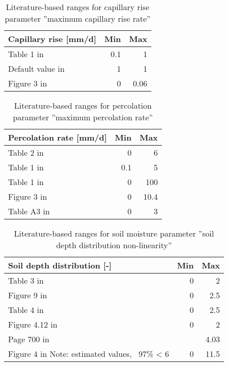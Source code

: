 \begin{table}[htbp]
  \centering
  \caption[References: Capillary rise rate]{Literature-based ranges for capillary rise parameter ''maximum capillary rise rate''}
    \begin{tabular}{lrr}
    \toprule
    \textbf{Capillary rise [mm/d]} & \textbf{Min} & \textbf{Max} \\
    \midrule
    Table 1 in \cite{Rusli2015} & 0.1   & 1 \\
    Default value in \cite{SMHI2004} & 1     & 1 \\
    Figure 3 in \cite{Bethune2008} & 0     & 0.06 \\
    \bottomrule
    \end{tabular}%
  \label{tab:sm4_cap}%
\end{table}%


\begin{table}[htbp]
  \centering
  \caption[References: Percolation rate]{Literature-based ranges for percolation parameter ''maximum percolation rate''}
    \begin{tabular}{lrr}
    \toprule
    \textbf{Percolation rate [mm/d]} & \textbf{Min} & \textbf{Max} \\
    \midrule
    Table 2 in \cite{Seibert1997} & 0     & 6 \\
    Table 1 in \cite{Rusli2015} & 0.1   & 5 \\
    Table 1 in \cite{Kollat2012} & 0     & 100 \\
    Figure 3 in \cite{Bethune2008} & 0     & 10.4 \\
    Table A3 in \cite{Seibert2012} & 0     & 3 \\
    \bottomrule
    \end{tabular}%
  \label{tab:sm4_perc}%
\end{table}%


\begin{table}[htbp]
  \centering
  \caption[References: Soil-depth distribution non-linearity]{Literature-based ranges for soil moisture parameter ''soil depth distribution non-linearity''}
    \begin{tabular}{lrr}
    \toprule
    \textbf{Soil depth distribution [-]} & \textbf{Min} & \textbf{Max} \\
    \midrule
    Table 3 in \cite{Sun2015} & 0     & 2 \\
    Figure 9 in \cite{Lamb1999} & 0     & 2.5 \\
    Table 4 in \cite{Bulygina2009} & 0     & 2.5 \\
    Figure 4.12 in \cite{Wagener2004}  & 0     & 2 \\
    Page 700 in \cite{Sivapalan1995} &       & 4.03 \\
    Figure 4 in \cite{Huang2003} Note: estimated values, ~97\% < 6 & 0     & 11.5 \\
    \bottomrule
    \end{tabular}%
  \label{tab:sm4_soilnl}%
\end{table}%

